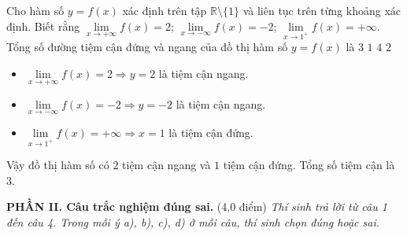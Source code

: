 \begin{ex}
Cho hàm số $y = f(x)$ xác định trên tập $\mathbb{R}\setminus\{1\}$ và liên tục trên từng khoảng xác định. Biết rằng $\lim\limits_{x\to +\infty} f(x) = 2$; $\lim\limits_{x\to -\infty} f(x) = -2$; $\lim\limits_{x\to 1^+} f(x) = +\infty$. Tổng số đường tiệm cận đứng và ngang của đồ thị hàm số $y = f(x)$ là
\choice
{\True $3$}
{$1$}
{$4$}
{$2$}
\begin{loigiai}
\begin{itemize}
    \item $\lim\limits_{x\to +\infty} f(x) = 2 \Rightarrow y = 2$ là tiệm cận ngang.
    \item $\lim\limits_{x\to -\infty} f(x) = -2 \Rightarrow y = -2$ là tiệm cận ngang.
    \item $\lim\limits_{x\to 1^+} f(x) = +\infty \Rightarrow x = 1$ là tiệm cận đứng.
\end{itemize}
Vậy đồ thị hàm số có $2$ tiệm cận ngang và $1$ tiệm cận đứng. Tổng số tiệm cận là $3$.
\end{loigiai}
\end{ex}

\vspace{0.5cm}
\noindent
\noindent\textbf{PHẦN II. Câu trắc nghiệm đúng sai.} (4,0 điểm) \textit{Thí sinh trả lời từ câu 1 đến câu 4. Trong mỗi ý a), b), c), d) ở mỗi câu, thí sinh chọn đúng hoặc sai.}

